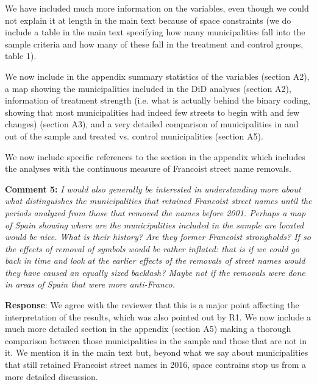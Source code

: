 \documentclass[12pt, a4paper, notitlepage]{article}
\begin{document}
We have included much more information on the variables, even though we could not explain it at length in the main text because of space constraints (we do include a table in the main text specifying how many municipalities fall into the sample criteria and how many of these fall in the treatment and control groups, table 1).

We now include in the appendix summary statistics of the variables (section A2), a map showing the municipalities included in the DiD analyses (section A2), information of treatment strength (i.e. what is actually behind the binary coding, showing that most municipalities had indeed few streets to begin with and few changes) (section A3), and a very detailed comparison of municipalities in and out of the sample and treated vs. control municipalities (section A5).

We now include specific references to the section in the appendix which includes the analyses with the continuous measure of Francoist street name removals.

\textbf{Comment 5:} \textit{I would also generally be interested in understanding more about what distinguishes the municipalities that retained Francoist street names until the periods analyzed from those that removed the names before 2001. Perhaps a map of Spain showing where are the municipalities included in the sample are located would be nice. What is their history? Are they former Francoist strongholds? If so the effects of removal of symbols would be rather inflated: that is if we could go back in time and look at the earlier effects of the removals of street names would they have caused an equally sized backlash? Maybe not if the removals were done in areas of Spain that were more anti-Franco.}

\textbf{Response}: We agree with the reviewer that this is a major point affecting the interpretation of the results, which was also pointed out by R1. We now include a much more detailed section in the appendix (section A5) making a thorough comparison between those municipalities in the sample and those that are not in it. We mention it in the main text but, beyond what we say about municipalities that still retained Francoist street names in 2016, space contrains stop us from a more detailed discussion.
\end{document}
